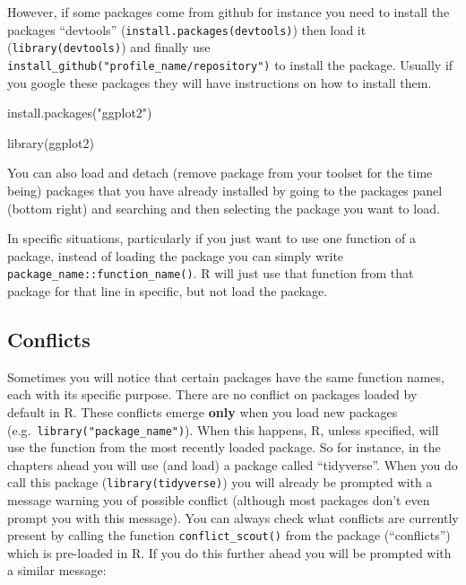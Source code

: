 \documentclass[
]{book}
\newenvironment{Shaded}{\begin{snugshade}}{\end{snugshade}}
\newcommand{\FunctionTok}[1]{\textcolor[rgb]{0.00,0.00,0.00}{#1}}
\newcommand{\NormalTok}[1]{#1}
\newcommand{\StringTok}[1]{\textcolor[rgb]{0.31,0.60,0.02}{#1}}
\begin{document}
However, if some packages come from github for instance you need to install the packages ``devtools'' (\texttt{install.packages(\textquotesingle{}devtools\textquotesingle{})}) then load it (\texttt{library(devtools)}) and finally use \texttt{install\_github("profile\_name/repository")} to install the package.
Usually if you google these packages they will have instructions on how to install them.

\begin{Shaded}
\begin{Highlighting}[]
\FunctionTok{install.packages}\NormalTok{(}\StringTok{"ggplot2"}\NormalTok{)}

\FunctionTok{library}\NormalTok{(ggplot2)}
\end{Highlighting}
\end{Shaded}

You can also load and detach (remove package from your toolset for the time being) packages that you have already installed by going to the packages panel (bottom right) and searching and then selecting the package you want to load.

In specific situations, particularly if you just want to use one function of a package, instead of loading the package you can simply write \texttt{package\_name::function\_name()}.
R will just use that function from that package for that line in specific, but not load the package.

\hypertarget{conflicts}{%
\subsection{Conflicts}\label{conflicts}}

Sometimes you will notice that certain packages have the same function names, each with its specific purpose.
There are no conflict on packages loaded by default in R.
These conflicts emerge \textbf{only} when you load new packages (e.g.~\texttt{library("package\_name")}).
When this happens, R, unless specified, will use the function from the most recently loaded package.
So for instance, in the chapters ahead you will use (and load) a package called ``tidyverse''.
When you do call this package (\texttt{library(tidyverse)}) you will already be prompted with a message warning you of possible conflict (although most packages don't even prompt you with this message).
You can always check what conflicts are currently present by calling the function \texttt{conflict\_scout()} from the package (``conflicts'') which is pre-loaded in R.
If you do this further ahead you will be prompted with a similar message:
\end{document}
